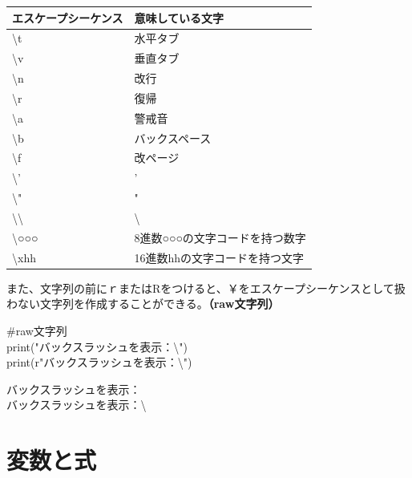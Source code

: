 \documentclass[11pt,a4paper]{jreport}
\begin{document}
\begin{table}[h]
 \begin{tabular}{|l|l|} \hline
  エスケープシーケンス          & 意味している文字               \\ \hline \hline
  \textbackslash t              & 水平タブ                       \\
  \textbackslash v              & 垂直タブ                       \\
  \textbackslash n              & 改行                           \\
  \textbackslash r              & 復帰                           \\
  \textbackslash a              & 警戒音                         \\
  \textbackslash b              & バックスペース                 \\
  \textbackslash f              & 改ページ                       \\
  \textbackslash '              & '                              \\
  \textbackslash "              & "                              \\
  \textbackslash \textbackslash & \textbackslash                 \\
  \textbackslash ○○○            & 8進数○○○の文字コードを持つ数字 \\
  \textbackslash xhh            & 16進数hhの文字コードを持つ文字 \\ \hline
 \end{tabular}

\end{table}

また、文字列の前にｒまたはRをつけると、￥をエスケープシーケンスとして扱わない文字列を作成することができる。{\bf （raw文字列）}

\begin{shadebox}
 \#raw文字列\\
 print("バックスラッシュを表示：\textbackslash")\\
 print(r"バックスラッシュを表示：\textbackslash")
\end{shadebox}
\vspace{0.2in}
\begin{screen}
 バックスラッシュを表示：\\
 バックスラッシュを表示：\textbackslash
\end{screen}
\vspace{0.2in}


\chapter{変数と式}%
\end{document}
